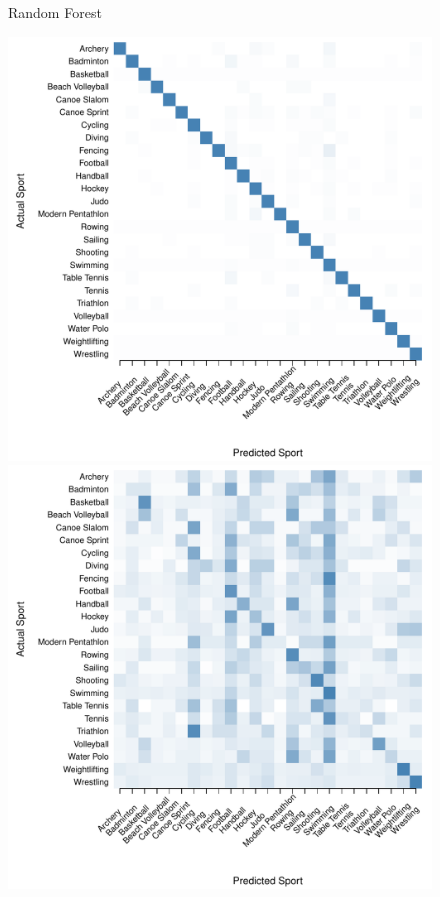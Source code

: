 \begin{figure}
\begin{center}
    Random Forest \\
  \begin{minipage}{0.20\textwidth}
    \begin{center}
      \includegraphics[scale=0.20]{../graphics/sportRF-trn.pdf}
    \end{center}
  \end{minipage}
  \hspace{0.05\textwidth}
  \begin{minipage}{0.20\textwidth}
    \begin{center}
      \includegraphics[scale=0.20]{../graphics/sportRF-tst.pdf}

\end{center}
\end{minipage}
\end{center}
\end{figure}
